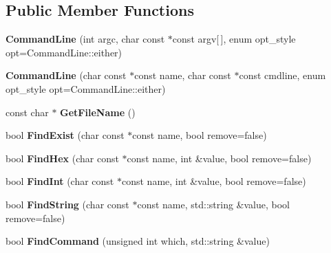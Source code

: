 \subsection*{Public Member Functions}
\begin{DoxyCompactItemize}
\item 
\hypertarget{classCommandLine_a564a8d1913e306decc89493674b3198e}{{\bfseries Command\-Line} (int argc, char const $\ast$const argv\mbox{[}$\,$\mbox{]}, enum opt\-\_\-style opt=Command\-Line\-::either)}\label{classCommandLine_a564a8d1913e306decc89493674b3198e}

\item 
\hypertarget{classCommandLine_a6f1b87cd2fd1823d0166c98a954872ae}{{\bfseries Command\-Line} (char const $\ast$const name, char const $\ast$const cmdline, enum opt\-\_\-style opt=Command\-Line\-::either)}\label{classCommandLine_a6f1b87cd2fd1823d0166c98a954872ae}

\item 
\hypertarget{classCommandLine_a1f45b4326873dbcd8e1f3a37293390e1}{const char $\ast$ {\bfseries Get\-File\-Name} ()}\label{classCommandLine_a1f45b4326873dbcd8e1f3a37293390e1}

\item 
\hypertarget{classCommandLine_afb34ecd52f6c897051767042bcca5918}{bool {\bfseries Find\-Exist} (char const $\ast$const name, bool remove=false)}\label{classCommandLine_afb34ecd52f6c897051767042bcca5918}

\item 
\hypertarget{classCommandLine_ac3fd4a68a14b29f1a23e9a828d6a0683}{bool {\bfseries Find\-Hex} (char const $\ast$const name, int \&value, bool remove=false)}\label{classCommandLine_ac3fd4a68a14b29f1a23e9a828d6a0683}

\item 
\hypertarget{classCommandLine_a8179a05544caa1ac6170f5a79f0a1d99}{bool {\bfseries Find\-Int} (char const $\ast$const name, int \&value, bool remove=false)}\label{classCommandLine_a8179a05544caa1ac6170f5a79f0a1d99}

\item 
\hypertarget{classCommandLine_a1fe7d738d6388a60e04c8479312743ef}{bool {\bfseries Find\-String} (char const $\ast$const name, std\-::string \&value, bool remove=false)}\label{classCommandLine_a1fe7d738d6388a60e04c8479312743ef}

\item 
\hypertarget{classCommandLine_a68fc2c8be26d62d89f29dafb7fba5799}{bool {\bfseries Find\-Command} (unsigned int which, std\-::string \&value)}\label{classCommandLine_a68fc2c8be26d62d89f29dafb7fba5799}


\end{DoxyCompactItemize}
